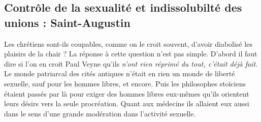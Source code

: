 \subsection{Contrôle de la sexualité et indissolubilté des unions : Saint-Augustin}

Les chrétiens sont-ils coupables, comme on le croit souvent, d'avoir diabolisé les plaisirs de la chair ? La réponse à cette question n'est pas simple. D'abord il faut dire si l'on en croit Paul Veyne qu'ils \emph{n'ont rien réprimé du tout, c'était déjà fait}. Le monde patriarcal des cités antiques n'était en rien un monde de liberté sexuelle, sauf pour les hommes libres, et encore. Puis les philosophes stoïciens étaient passés par là pour exiger des hommes libres eux-mêmes qu'ils orientent leurs désirs vers la seule procréation. Quant aux médecins ils allaient eux aussi dans le sens d'une grande modération dans l'activité sexuelle. 

